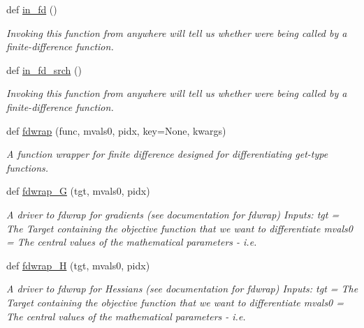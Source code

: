 \begin{DoxyCompactItemize}
def \hyperlink{namespacesrc_1_1finite__difference_a6153660ad18674fc1d2ad6fd57541ef3}{in\+\_\+fd} ()
\begin{DoxyCompactList}\small\item\em Invoking this function from anywhere will tell us whether we\textquotesingle{}re being called by a finite-\/difference function. \end{DoxyCompactList}\item 
def \hyperlink{namespacesrc_1_1finite__difference_af62619af114a030e945e0963a8d25090}{in\+\_\+fd\+\_\+srch} ()
\begin{DoxyCompactList}\small\item\em Invoking this function from anywhere will tell us whether we\textquotesingle{}re being called by a finite-\/difference function. \end{DoxyCompactList}\item 
def \hyperlink{namespacesrc_1_1finite__difference_af3a9d7a4fc96a7057679fa5f3af73fe0}{fdwrap} (func, mvals0, pidx, key=None, kwargs)
\begin{DoxyCompactList}\small\item\em A function wrapper for finite difference designed for differentiating \textquotesingle{}get\textquotesingle{}-\/type functions. \end{DoxyCompactList}\item 
def \hyperlink{namespacesrc_1_1finite__difference_ad60720d6270fcf96cb4bd2a9957620ed}{fdwrap\+\_\+G} (tgt, mvals0, pidx)
\begin{DoxyCompactList}\small\item\em A driver to fdwrap for gradients (see documentation for fdwrap) Inputs\+: tgt = The Target containing the objective function that we want to differentiate mvals0 = The \textquotesingle{}central\textquotesingle{} values of the mathematical parameters -\/ i.\+e. \end{DoxyCompactList}\item 
def \hyperlink{namespacesrc_1_1finite__difference_a29e89e33f7fd5acd4569125c0c5f4732}{fdwrap\+\_\+H} (tgt, mvals0, pidx)
\begin{DoxyCompactList}\small\item\em A driver to fdwrap for Hessians (see documentation for fdwrap) Inputs\+: tgt = The Target containing the objective function that we want to differentiate mvals0 = The \textquotesingle{}central\textquotesingle{} values of the mathematical parameters -\/ i.\+e. \end{DoxyCompactList}\end{DoxyCompactItemize}
